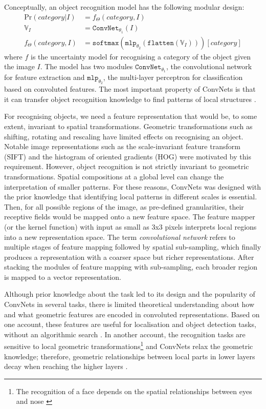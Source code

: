 Conceptually, an object recognition model has the following modular design:
\begin{align}
\mathrm{Pr}( category | I ) &= f_\Theta(category,I) \\
\mathbb{V}_{I}              &= \mathtt{ConvNet}_{\theta_1}(I) \\
f_\Theta(category,I)        &= \mathtt{softmax}(\mathtt{mlp}_{\theta_2}(\mathtt{flatten}(\mathbb{V}_{I})))[category]
\end{align}
\noindent where $f$ is the uncertainty model for recognising a category of the object given the image $I$. 
The model has two modules \textemdash $\mathtt{ConvNet}_{\theta_1}$, the convolutional network for feature extraction and $\mathtt{mlp}_{\theta_2}$, the multi-layer perceptron for classification based on convoluted features. The most important property of ConvNets is that it can transfer object recognition knowledge to find patterns of local structures \citep{lecun2010convolutional}.

For recognising objects, we need a feature representation that would be, to some extent, invariant to spatial transformations. Geometric transformations such as shifting, rotating and rescaling have limited effects on recognising an object. Notable image representations such as the scale-invariant feature transform (SIFT) \citep{lowe2004distinctive} and the histogram of oriented gradients (HOG) \citep{dalal2005histograms} were motivated by this requirement. 
However, object recognition is not strictly invariant to geometric transformations. Spatial compositions at a global level can change the interpretation of smaller patterns. 
For these reasons, ConvNets was designed with the prior knowledge that identifying local patterns in different scales is essential. 
Then, for all possible regions of the image, as pre-defined granularities, their receptive fields would be mapped onto a new feature space. 
The feature mapper (or the kernel function)
with input as small as 3x3 pixels interprets local regions into a new representation space.
The term \emph{convolutional network} refers to multiple stages of feature mapping followed by spatial sub-sampling, which finally produces a representation with a coarser space but richer representations. 
After stacking the modules of feature mapping with sub-sampling, each broader region is mapped to a vector representation.

Although prior knowledge about the task led to its design and the popularity of ConvNets in several tasks, there is limited theoretical understanding about how and what geometric features are encoded in convoluted representations.
Based on one account, these features are useful for localisation and object detection tasks, without an algorithmic search \citep{Lenc15a,ren2015faster}. 
In another account, the recognition tasks are sensitive to local geometric transformations\footnote{The recognition of a face depends on the spatial relationships between eyes and nose \citep{hinton2011transforming}}
and ConvNets relax the geometric knowledge; therefore, geometric relationships between local parts in lower layers decay when reaching the higher layers \citep{hinton2011transforming,lenc2015understanding,kelleher2017what}. 

